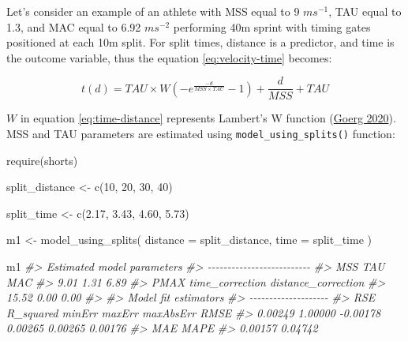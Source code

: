 \documentclass[fleqn,10pt,lineno]{wlpeerj} %
\newenvironment{Shaded}{\begin{snugshade}}{\end{snugshade}}
\newcommand{\AttributeTok}[1]{\textcolor[rgb]{0.77,0.63,0.00}{#1}}
\newcommand{\CommentTok}[1]{\textcolor[rgb]{0.56,0.35,0.01}{\textit{#1}}}
\newcommand{\DecValTok}[1]{\textcolor[rgb]{0.00,0.00,0.81}{#1}}
\newcommand{\FloatTok}[1]{\textcolor[rgb]{0.00,0.00,0.81}{#1}}
\newcommand{\FunctionTok}[1]{\textcolor[rgb]{0.00,0.00,0.00}{#1}}
\newcommand{\NormalTok}[1]{#1}
\newcommand{\OtherTok}[1]{\textcolor[rgb]{0.56,0.35,0.01}{#1}}
\begin{document}
Let's consider an example of an athlete with MSS equal to 9 \(ms^{-1}\), TAU equal to 1.3, and MAC equal to 6.92 \(ms^{-2}\) performing 40m sprint with timing gates positioned at each 10m split. For split times, distance is a predictor, and time is the outcome variable, thus the equation \eqref{eq:velocity-time} becomes:

\begin{equation}
  t(d) = TAU \times W(-e^{\frac{-d}{MSS \times TAU}} - 1) + \frac{d}{MSS} + TAU \label{eq:time-distance}
\end{equation}

\(W\) in equation \eqref{eq:time-distance} represents Lambert's W function (\protect\hyperlink{ref-R-LambertW}{Goerg 2020}). MSS and TAU parameters are estimated using \texttt{model\_using\_splits()} function:

\begin{Shaded}
\begin{Highlighting}[]
\FunctionTok{require}\NormalTok{(shorts)}

\NormalTok{split\_distance }\OtherTok{\textless{}{-}} \FunctionTok{c}\NormalTok{(}\DecValTok{10}\NormalTok{, }\DecValTok{20}\NormalTok{, }\DecValTok{30}\NormalTok{, }\DecValTok{40}\NormalTok{)}

\NormalTok{split\_time }\OtherTok{\textless{}{-}} \FunctionTok{c}\NormalTok{(}\FloatTok{2.17}\NormalTok{, }\FloatTok{3.43}\NormalTok{, }\FloatTok{4.60}\NormalTok{, }\FloatTok{5.73}\NormalTok{)}

\NormalTok{m1 }\OtherTok{\textless{}{-}} \FunctionTok{model\_using\_splits}\NormalTok{(}
  \AttributeTok{distance =}\NormalTok{ split\_distance,}
  \AttributeTok{time =}\NormalTok{ split\_time}
\NormalTok{)}

\NormalTok{m1}
\CommentTok{\#\textgreater{} Estimated model parameters}
\CommentTok{\#\textgreater{} {-}{-}{-}{-}{-}{-}{-}{-}{-}{-}{-}{-}{-}{-}{-}{-}{-}{-}{-}{-}{-}{-}{-}{-}{-}{-}}
\CommentTok{\#\textgreater{}                 MSS                 TAU                 MAC }
\CommentTok{\#\textgreater{}                9.01                1.31                6.89 }
\CommentTok{\#\textgreater{}                PMAX     time\_correction distance\_correction }
\CommentTok{\#\textgreater{}               15.52                0.00                0.00 }
\CommentTok{\#\textgreater{} }
\CommentTok{\#\textgreater{} Model fit estimators}
\CommentTok{\#\textgreater{} {-}{-}{-}{-}{-}{-}{-}{-}{-}{-}{-}{-}{-}{-}{-}{-}{-}{-}{-}{-}}
\CommentTok{\#\textgreater{}       RSE R\_squared    minErr    maxErr maxAbsErr      RMSE }
\CommentTok{\#\textgreater{}   0.00249   1.00000  {-}0.00178   0.00265   0.00265   0.00176 }
\CommentTok{\#\textgreater{}       MAE      MAPE }
\CommentTok{\#\textgreater{}   0.00157   0.04742}
\end{Highlighting}
\end{Shaded}
\end{document}
